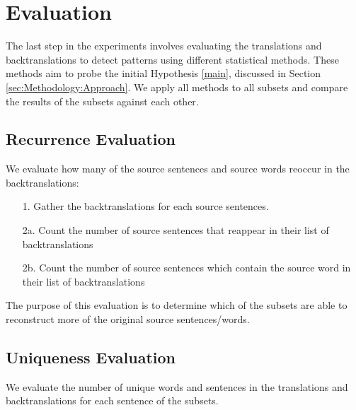 \section{Evaluation}
\label{sec:Experiments:Evaluation}

The last step in the experiments involves evaluating the translations and backtranslations to detect patterns using different statistical methods. These methods aim to probe the initial Hypothesis \ref{main}, discussed in Section \ref{sec:Methodology:Approach}. We apply all methods to all subsets and compare the results of the subsets against each other.


\subsection{Recurrence Evaluation}
\label{sec:Experiments:Statistics:Recurrence}
We evaluate how many of the source sentences and source words reoccur in the backtranslations:

\begin{enumerate}
    \item[1. ] Gather the backtranslations for each source sentences.
    \item[2a. ] Count the number of source sentences that reappear in their list of backtranslations
    \item[2b. ] Count the number of source sentences which contain the source word in their list of backtranslations
\end{enumerate}

The purpose of this evaluation is to determine which of the subsets are able to reconstruct more of the original source sentences/words.

\subsection{Uniqueness Evaluation}
\label{sec:Experiments:Statistics:Uniqueness}
We evaluate the number of unique words and sentences in the translations and backtranslations for each sentence of the subsets. 

